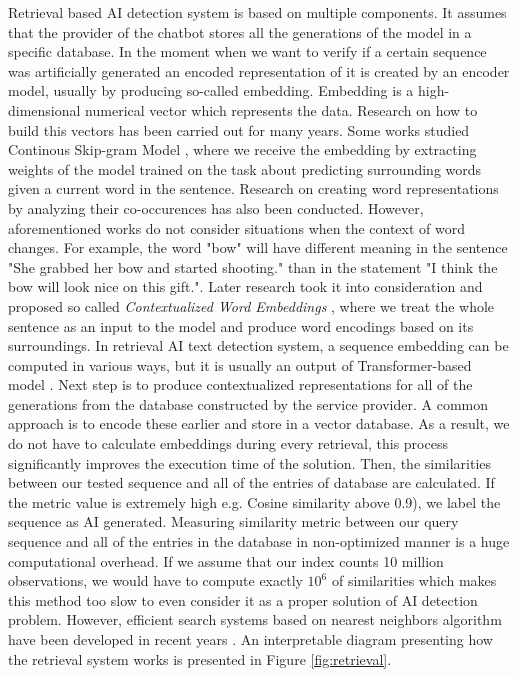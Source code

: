 \documentclass[12pt]{report}
\begin{document}
Retrieval based AI detection system is based on multiple components. It assumes that the provider of the chatbot stores all the generations of the model in a specific database. In the moment when we want to verify if a certain sequence was artificially generated an encoded representation of it is created by an encoder model, usually by producing so-called embedding. Embedding is a high-dimensional numerical vector which represents the data. Research on how to build this vectors has been carried out for many years. Some works studied Continous Skip-gram Model \citep{mikolov2013distributed, mikolov2013efficient}, where we receive the embedding by extracting weights of the model trained on the task about predicting surrounding words given a current word in the sentence. Research on creating word representations by analyzing their co-occurences \cite{pennington-etal-2014-glove} has also been conducted. However, aforementioned works do not consider situations when the context of word changes. For example, the word "bow" will have different meaning in the sentence "She grabbed her bow and started shooting." than in the statement "I think the bow will look nice on this gift.". Later research took it into consideration and proposed so called \textit{Contextualized Word Embeddings} \citep{schuster2019crosslingualcontextualembeddings, peters2018deepcontextualizedembeddings}, where we treat the whole sentence as an input to the model and produce word encodings based on its surroundings. In retrieval AI text detection system, a sequence embedding can be computed in various ways, but it is usually an output of Transformer-based model \cite{vaswani2023attention}. Next step is to produce contextualized representations for all of the generations from the database constructed by the service provider. A common approach is to encode these earlier and store in a vector database. As a result, we do not have to calculate embeddings during every retrieval, this process significantly improves the execution time of the solution. Then, the similarities between our tested sequence and all of the entries of database are calculated. If the metric value is extremely high e.g. Cosine similarity above 0.9), we label the sequence as AI generated. Measuring similarity metric between our query sequence and all of the entries in the database in non-optimized manner is a huge computational overhead. If we assume that our index counts 10 million observations, we would have to compute exactly $10^{6}$ of similarities which makes this method too slow to even consider it as a proper solution of AI detection problem. However, efficient search systems based on nearest neighbors algorithm have been developed in recent years \citep{FAISS, NSLM}. An interpretable diagram presenting how the retrieval system works is presented in Figure \ref{fig:retrieval}.
\end{document}
